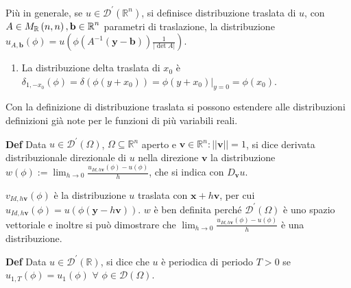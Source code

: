 \documentclass{article}
\begin{document}
Pi\`{u} in generale, se $u\in \mathcal{D}^{\prime }\left( 
\mathbb{R}
^{n}\right) $, si definisce distribuzione traslata di $u$, con $A\in M_{%
\mathbb{R}
}\left( n,n\right) ,\mathbf{b\in 
\mathbb{R}
}^{n}$ parametri di traslazione, la distribuzione $u_{A,\mathbf{b}}\left(
\phi \right) =u\left( \phi \left( A^{-1}\left( \mathbf{y-b}\right) \right) 
\frac{1}{\left\vert \det A\right\vert }\right) $.

\begin{enumerate}
\item La distribuzione delta traslata di $x_{0}$ \`{e} $\delta
_{1,-x_{0}}\left( \phi \right) =\delta \left( \phi \left( y+x_{0}\right)
\right) =\phi \left( y+x_{0}\right) |_{y=0}=\phi \left( x_{0}\right) $.
\end{enumerate}

Con la definizione di distribuzione traslata si possono estendere alle
distribuzioni definizioni gi\`{a} note per le funzioni di pi\`{u} variabili
reali.

\textbf{Def} Data $u\in \mathcal{D}^{\prime }\left( \Omega \right) $, $%
\Omega \subseteq 
\mathbb{R}
^{n}$ aperto e $\mathbf{v}\in 
\mathbb{R}
^{n}:\left\vert \left\vert \mathbf{v}\right\vert \right\vert =1$, si dice
derivata distribuzionale direzionale di $u$ nella direzione $\mathbf{v}$ la
distribuzione $w\left( \phi \right) :=\lim_{h\rightarrow 0}\frac{u_{Id,h%
\mathbf{v}}\left( \phi \right) -u\left( \phi \right) }{h}$, che si indica
con $D_{\mathbf{v}}u$.

$v_{Id,h\mathbf{v}}\left( \phi \right) $ \`{e} la distribuzione $u$ traslata
con $\mathbf{x}+h\mathbf{v}$, per cui $u_{Id,h\mathbf{v}}\left( \phi \right)
=u\left( \phi \left( \mathbf{y-}h\mathbf{v}\right) \right) $. $w$ \`{e} ben
definita perch\'{e} $\mathcal{D}^{\prime }\left( \Omega \right) $ \`{e} uno
spazio vettoriale e inoltre si pu\`{o} dimostrare che $\lim_{h\rightarrow 0}%
\frac{u_{Id,h\mathbf{v}}\left( \phi \right) -u\left( \phi \right) }{h}$ \`{e}
una distribuzione.

\textbf{Def} Data $u\in \mathcal{D}^{\prime }\left( 
\mathbb{R}
\right) $, si dice che $u$ \`{e} periodica di periodo $T>0$ se $%
u_{1,T}\left( \phi \right) =u_{1}\left( \phi \right) $ $\forall $ $\phi \in 
\mathcal{D}\left( \Omega \right) $.
\end{document}
